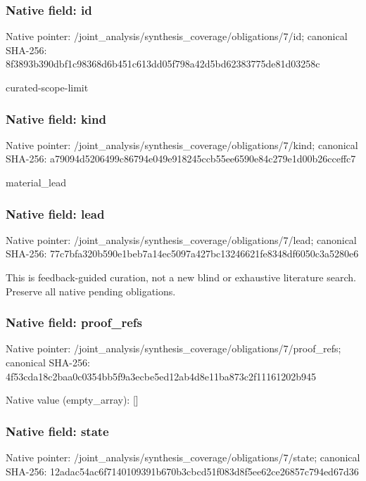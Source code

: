 \documentclass[10pt,a4paper]{article}
\begin{document}
\subsubsection{Native field: id}
Native pointer: /joint\_\allowbreak{}analysis/synthesis\_\allowbreak{}coverage/obligations/7/id; canonical SHA-256: 8f3893b390dbf1c98368d6b451c613dd05f798a42d5bd62383775de81d03258c

\begingroup\raggedright\sloppy curated-scope-limit\par\endgroup

\subsubsection{Native field: kind}
Native pointer: /joint\_\allowbreak{}analysis/synthesis\_\allowbreak{}coverage/obligations/7/kind; canonical SHA-256: a79094d5206499c86794e049e918245ccb55ee6590e84c279e1d00b26cceffc7

\begingroup\raggedright\sloppy material\_\allowbreak{}lead\par\endgroup

\subsubsection{Native field: lead}
Native pointer: /joint\_\allowbreak{}analysis/synthesis\_\allowbreak{}coverage/obligations/7/lead; canonical SHA-256: 77c7bfa320b590e1beb7a14ec5097a427bc13246621fe8348df6050c3a5280e6

\begingroup\raggedright\sloppy This is feedback-guided curation,\allowbreak{} not a new blind or exhaustive literature search. Preserve all native pending obligations.\par\endgroup

\subsubsection{Native field: proof\_\allowbreak{}refs}
Native pointer: /joint\_\allowbreak{}analysis/synthesis\_\allowbreak{}coverage/obligations/7/proof\_\allowbreak{}refs; canonical SHA-256: 4f53cda18c2baa0c0354bb5f9a3ecbe5ed12ab4d8e11ba873c2f11161202b945

Native value (empty\_\allowbreak{}array): []

\subsubsection{Native field: state}
Native pointer: /joint\_\allowbreak{}analysis/synthesis\_\allowbreak{}coverage/obligations/7/state; canonical SHA-256: 12adac54ac6f7140109391b670b3cbcd51f083d8f5ee62ce26857c794ed67d36
\end{document}
